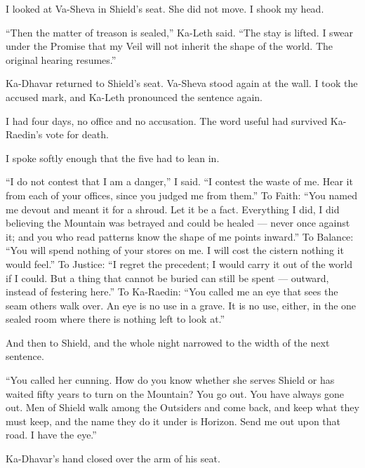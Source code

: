 I looked at Va-Sheva in Shield's seat. She did not move. I shook my head.\par

``Then the matter of treason is sealed,'' Ka-Leth said. ``The stay is lifted. I swear under the Promise that my Veil will not inherit the shape of the world. The original hearing resumes.''\par

Ka-Dhavar returned to Shield's seat. Va-Sheva stood again at the wall. I took the accused mark, and Ka-Leth pronounced the sentence again.\par

\ornament

I had four days, no office and no accusation. The word useful had survived Ka-Raedin's vote for death.\par

I spoke softly enough that the five had to lean in.\par

``I do not contest that I am a danger,'' I said. ``I contest the waste of me. Hear it from each of your offices, since you judged me from them.'' To Faith: ``You named me devout and meant it for a shroud. Let it be a fact. Everything I did, I did believing the Mountain was betrayed and could be healed --- never once against it; and you who read patterns know the shape of me points inward.'' To Balance: ``You will spend nothing of your stores on me. I will cost the cistern nothing it would feel.'' To Justice: ``I regret the precedent; I would carry it out of the world if I could. But a thing that cannot be buried can still be spent --- outward, instead of festering here.'' To Ka-Raedin: ``You called me an eye that sees the seam others walk over. An eye is no use in a grave. It is no use, either, in the one sealed room where there is nothing left to look at.''\par

And then to Shield, and the whole night narrowed to the width of the next sentence.\par

``You called her cunning. How do you know whether she serves Shield or has waited fifty years to turn on the Mountain? You go out. You have always gone out. Men of Shield walk among the Outsiders and come back, and keep what they must keep, and the name they do it under is Horizon. Send me out upon that road. I have the eye.''\par

Ka-Dhavar's hand closed over the arm of his seat.\par

